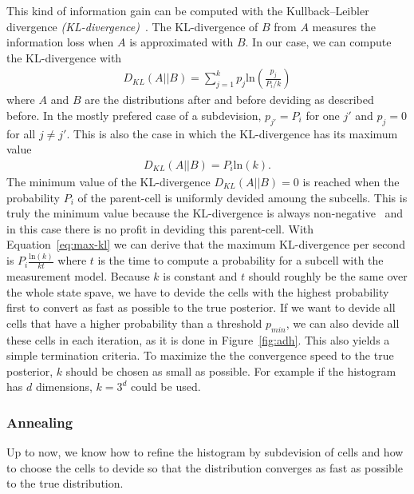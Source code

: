 \documentclass[twoside,a4paper,article]{combine}
\begin{document}
This kind of information gain can be computed with the
Kullback–Leibler divergence \textit{(KL-divergence)}~\cite{kl-divergence}. The
KL-divergence of $B$ from $A$ measures the information loss when $A$
is approximated with $B$. In our case, we can compute the
KL-divergence with
\begin{align}
  D_{KL}(A||B)=\sum_{j=1}^k p_j \mathrm{ln}\left(\frac{p_j}{P_i/k}\right)
\end{align}
where $A$ and $B$ are the distributions after and before deviding as
described before. In the mostly prefered case of a subdevision,
$p_{j'}=P_i$ for one $j'$ and $p_j=0$ for all $j\neq j'$. This is also
the case in which the KL-divergence has its maximum value
\begin{align}
  D_{KL}(A||B)=P_i \mathrm{ln}(k) \mathrm{ . }
  \label{eq:max-kl}
\end{align}
The minimum value of the KL-divergence $D_{KL}(A||B)=0$ is reached
when the probability $P_i$ of the parent-cell is uniformly devided
amoung the subcells. This is truly the minimum value because the
KL-divergence is always non-negative~\cite{kl-divergence} and in this
case there is no profit in deviding this parent-cell. With
Equation~\ref{eq:max-kl} we can derive that the maximum KL-divergence
per second is $P_i \frac{\mathrm{ln } (k)}{kt}$ where $t$ is the time
to compute a probability for a subcell with the measurement
model. Because $k$ is constant and $t$ should roughly be the same over
the whole state spave, we have to devide the cells with the highest
probability first to convert as fast as possible to the true
posterior. If we want to devide all cells that have a higher
probability than a threshold $p_{min}$, we can also devide all these
cells in each iteration, as it is done in Figure~\ref{fig:adh}. This
also yields a simple termination criteria. To maximize the the
convergence speed to the true posterior, $k$ should be chosen as small
as possible. For example if the histogram has $d$ dimensions, $k=3^d$
could be used.

\subsubsection{Annealing}
\label{sub:annealing}
Up to now, we know how to refine the histogram by subdevision of cells
and how to choose the cells to devide so that the distribution
converges as fast as possible to the true distribution.
\end{document}
